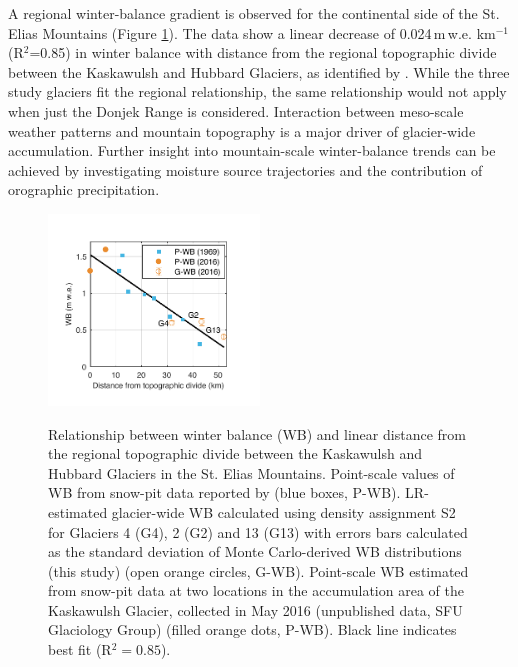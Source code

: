 \documentclass{sfuthesis}
\begin{document}
{A regional winter-balance gradient is observed for the continental side of the St. Elias Mountains (Figure \ref{fig:AccumGrad}). The data show a linear decrease of 0.024\,m\,w.e. km$^{-1}$ (R$^2$=0.85) in winter balance with distance from the regional topographic divide between the Kaskawulsh and Hubbard Glaciers, as identified by \cite{Taylor1969}. While the three study glaciers fit the regional relationship, the same relationship would not apply when just the Donjek Range is considered. Interaction between meso-scale weather patterns and mountain topography is a major driver of glacier-wide accumulation. Further insight into mountain-scale winter-balance trends can be achieved by investigating moisture source trajectories and  the contribution of orographic precipitation. 

\begin{figure}[H]
	\centering
	\includegraphics[width =0.5\textwidth]{AccumGrad.pdf}\\
	\caption[Relationship between winter balance (WB) and linear distance from the regional topographic divide between the Kaskawulsh and Hubbard Glaciers in the St. Elias Mountains]{Relationship between winter balance (WB) and linear distance from the regional topographic divide between the Kaskawulsh and Hubbard Glaciers in the St. Elias Mountains. Point-scale values of WB from snow-pit data reported by \cite{Taylor1969} (blue boxes, P-WB). LR-estimated glacier-wide WB calculated using density assignment S2 for Glaciers 4 (G4), 2 (G2) and 13 (G13) with errors bars calculated as the standard deviation of Monte Carlo-derived WB distributions (this study) (open orange circles, G-WB). Point-scale WB estimated from snow-pit data at two locations in the accumulation area of the Kaskawulsh Glacier, collected in May 2016 (unpublished data, SFU Glaciology Group) (filled orange dots, P-WB). Black line indicates best fit (R$^2=0.85$).}
	\label{fig:AccumGrad}
\end{figure}



}
\end{document}
